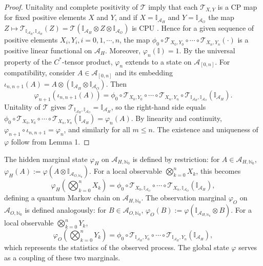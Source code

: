 \documentclass[12pt,a4paper]{article}
\begin{document}
\begin{proof}
Unitality and complete positivity of $\mathcal{T}$ imply that each $\mathcal{T}_{X,Y}$ is a CP map for fixed positive elements $X$ and $Y$,  and if $X =\mathbb{I}_{\mathcal{A}_H}$ and $Y= \mathbb{I}_{\mathcal{A}_O}$ the map $Z \mapsto \mathcal{T}_{\mathbb{I}_{\mathcal{A}_H},\mathbb{I}_{\mathcal{A}_H}}(Z) = \mathcal{T}(\mathbb{I}_{\mathcal{A}_H}\otimes Z\otimes \mathbb{I}_{\mathcal{A}_O})$ is CPU . Hence  for a given sequence of positive elements $X_i,Y_i, i =0,1,\cdots,n$, the map $\phi_0 \circ \mathcal{T}_{X_0,Y_0} \circ \cdots \circ \mathcal{T}_{X_n,Y_n}(\cdot)$ is a positive linear functional on $\mathcal{A}_H$. Moreover, $\varphi_n(\mathbb{I}) = 1$. By the universal property of the $C^*$-tensor product, $\varphi_n$ extends to a state on $\mathcal{A}_{[0,n]}$. For compatibility, consider $A \in \mathcal{A}_{[0,n]}$ and its embedding $\iota_{n,n+1}(A) = A \otimes (\mathbb{I}_{\mathcal{A}_H} \otimes \mathbb{I}_{\mathcal{A}_O})$. Then
\[
\varphi_{n+1}(\iota_{n,n+1}(A)) = \phi_0 \circ \mathcal{T}_{X_0,Y_0} \circ \cdots \circ \mathcal{T}_{X_n,Y_n} \circ \mathcal{T}_{\mathbb{I}_{\mathcal{A}_H},\mathbb{I}_{\mathcal{A}_O}}(\mathbb{I}_{\mathcal{A}_H}).
\]
Unitality of $\mathcal{T}$ gives $\mathcal{T}_{\mathbb{I}_{\mathcal{A}_H},\mathbb{I}_{\mathcal{A}_O}} = \mathbb{I}_{\mathcal{A}_H}$, so the right-hand side equals $\phi_0 \circ \mathcal{T}_{X_0,Y_0} \circ \cdots \circ \mathcal{T}_{X_n,Y_n}(\mathbb{I}_{\mathcal{A}_H}) = \varphi_n(A)$. By linearity and continuity, $\varphi_{n+1} \circ \iota_{n,n+1} = \varphi_n$, and similarly for all $m \le n$. The existence and uniqueness of $\varphi$ follow from Lemma 1.
\end{proof}

The hidden marginal state $\varphi_H$ on $\mathcal{A}_{H,\mathbb{N}_0}$ is defined by restriction: for $A \in \mathcal{A}_{H,\mathbb{N}_0}$, $\varphi_H(A) := \varphi(A \otimes \mathbb{I}_{\mathcal{A}_{O,\mathbb{N}_0}})$. For a local observable $\bigotimes_{k=0}^n X_k$, this becomes
\[
\varphi_H\!\left( \bigotimes_{k=0}^n X_k \right) = \phi_0 \circ \mathcal{T}_{X_0,\mathbb{I}_{\mathcal{A}_O}} \circ \cdots \circ \mathcal{T}_{X_n,\mathbb{I}_{\mathcal{A}_O}}(\mathbb{I}_{\mathcal{A}_H}),
\]
defining a quantum Markov chain on $\mathcal{A}_{H,\mathbb{N}_0}$. The observation marginal $\varphi_O$ on $\mathcal{A}_{O,\mathbb{N}_0}$ is defined analogously: for $B \in \mathcal{A}_{O,\mathbb{N}_0}$, $\varphi_O(B) := \varphi(\mathbb{I}_{\mathcal{A}_{H,\mathbb{N}_0}} \otimes B)$. For a local observable $\bigotimes_{k=0}^n Y_k$,
\[
\varphi_O\!\left( \bigotimes_{k=0}^n Y_k \right) = \phi_0 \circ \mathcal{T}_{\mathbb{I}_{\mathcal{A}_H},Y_0} \circ \cdots \circ \mathcal{T}_{\mathbb{I}_{\mathcal{A}_H},Y_n}(\mathbb{I}_{\mathcal{A}_H}),
\]
which represents the statistics of the observed process. The global state $\varphi$ serves as a coupling of these two marginals.
\end{document}
